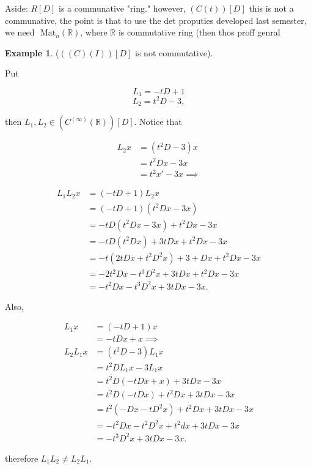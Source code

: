 \documentclass[12pt,a4paper]{article}
\theoremstyle{definition}
\newtheorem*{example}{Example}
\begin{document}
Aside: \( R[D] \) is a communative "ring." however, \( (C(t))[D] \) this
is not a communative, the point is that to use the det proputies
developed last semester, we need \( \text{ Mat}_n( \mathbb{R}) \), where
\( \mathbb{R} \) is commutative ring (then thos proff genral

\begin{example}
  (\( ((C)(I))[D] \) is not commutative). 

  Put

  \[ L_1 = -tD+1 \]
  \[ L_2 = t^2D - 3, \]

  then \( L_1, L_2 \in ( C^{(\infty)}( \mathbb{R}) ) [D] \). Notice that 

  \begin{align*}
    L_2x &= (t^2D-3)x \\
    &= t^2Dx-3x \\
    &= t^2x' -3x \implies
  \end{align*}

  \begin{align*}
    L_1L_2x &= (-tD + 1)L_2x \\
    &= (-tD + 1)(t^2Dx-3x) \\
    &= -tD(t^2Dx-3x) + t^2Dx-3x \\
    &= -tD(t^2Dx) + 3tDx + t^2Dx-3x \\
    &= -t(2tDx + t^2D^2x) + 3+ Dx + t^2Dx-3x \\
    &= -2t^2Dx - t^3D^2x + 3tDx + t^2Dx - 3x \\
    &= -t^2Dx - t^3D^2x + 3tDx - 3x. 
  \end{align*}

  Also, 

  \begin{align*}
    L_1x &= (-tD+1)x \\
    &= -tDx + x \implies \\
    L_2L_1x &= (t^2D-3)L_1x \\
    &= t^2DL_1x - 3L_1x \\
    &= t^2D(-tDx+x) + 3tDx - 3x \\
    &= t^2D(-tDx) + t^2Dx + 3tDx-3x \\
    &= t^2( -Dx- tD^2x) + t^2Dx+3tDx - 3x \\
    &= -t^2Dx - t^2D^2x + t^2dx + 3tDx - 3x \\
    &= -t^3D^2x+ 3tDx-3x. 
  \end{align*}

  therefore \( L_1L_2 \neq L_2L_1. \)

\end{example}
\end{document}
